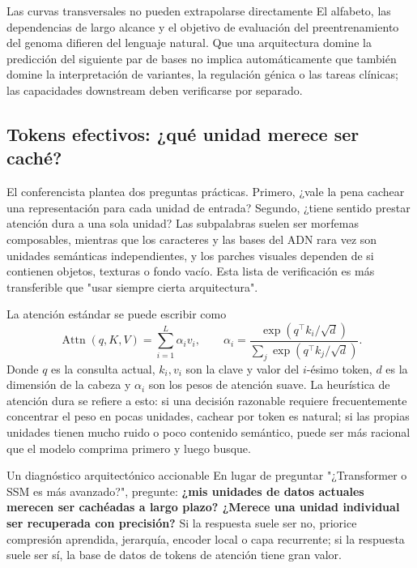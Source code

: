 
\begin{warningbox}{Las curvas transversales no pueden extrapolarse directamente}
El alfabeto, las dependencias de largo alcance y el objetivo de evaluación del preentrenamiento del genoma difieren del lenguaje natural. Que una arquitectura domine la predicción del siguiente par de bases no implica automáticamente que también domine la interpretación de variantes, la regulación génica o las tareas clínicas; las capacidades downstream deben verificarse por separado.
\end{warningbox}

\subsection{Tokens efectivos: ¿qué unidad merece ser caché?}

El conferencista plantea dos preguntas prácticas. Primero, ¿vale la pena cachear una representación para cada unidad de entrada? Segundo, ¿tiene sentido prestar atención dura a una sola unidad? Las subpalabras suelen ser morfemas composables, mientras que los caracteres y las bases del ADN rara vez son unidades semánticas independientes, y los parches visuales dependen de si contienen objetos, texturas o fondo vacío. Esta lista de verificación es más transferible que "usar siempre cierta arquitectura".


La atención estándar se puede escribir como
\[
\operatorname{Attn}(q,K,V)
=\sum_{i=1}^{L}\alpha_i v_i,
\qquad
\alpha_i=\frac{\exp(q^\top k_i/\sqrt d)}{\sum_j\exp(q^\top k_j/\sqrt d)}.
\]
Donde $q$ es la consulta actual, $k_i,v_i$ son la clave y valor del $i$-ésimo token, $d$ es la dimensión de la cabeza y $\alpha_i$ son los pesos de atención suave. La heurística de atención dura se refiere a esto: si una decisión razonable requiere frecuentemente concentrar el peso en pocas unidades, cachear por token es natural; si las propias unidades tienen mucho ruido o poco contenido semántico, puede ser más racional que el modelo comprima primero y luego busque.

\begin{importantbox}{Un diagnóstico arquitectónico accionable}
En lugar de preguntar "¿Transformer o SSM es más avanzado?", pregunte: \textbf{¿mis unidades de datos actuales merecen ser cachéadas a largo plazo? ¿Merece una unidad individual ser recuperada con precisión?} Si la respuesta suele ser no, priorice compresión aprendida, jerarquía, encoder local o capa recurrente; si la respuesta suele ser sí, la base de datos de tokens de atención tiene gran valor.
\end{importantbox}

